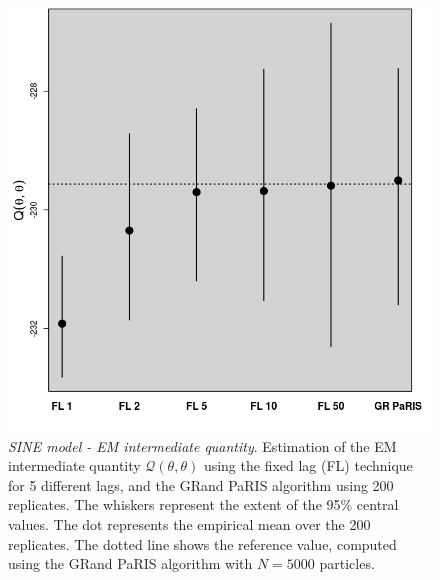 \documentclass[12pt]{article}
\newcommand{\1}{\mathrm{1}}
\begin{document}
\begin{figure}[p]
\centering
\includegraphics[scale=0.5]{res_Estep_SINE}
\caption{{\em SINE model - EM intermediate quantity}. Estimation of the EM intermediate quantity $\mathcal{Q}(\theta,\theta)$  using the fixed lag (FL) technique for 5 different lags, and the GRand PaRIS algorithm using 200 replicates. 
The whiskers represent the extent of the 95\% central values. 
The dot represents the empirical mean over the 200 replicates. 
The dotted line shows the reference value, computed using the GRand PaRIS algorithm with $N = 5000$ particles.}
\label{fig:res:SINE:EM}
\end{figure}
\end{document}
